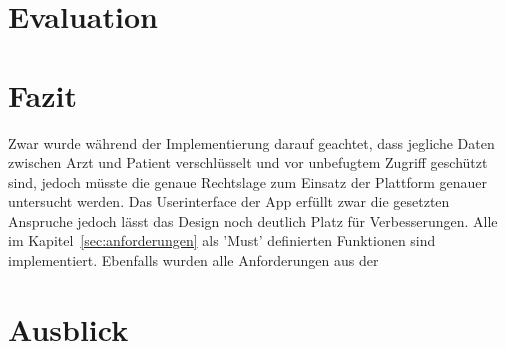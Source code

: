     \newpage
    \chapter{Evaluation}
    \chapter{Fazit}\label{ch:fazit}
    Zwar wurde während der Implementierung darauf geachtet, dass jegliche Daten zwischen Arzt und Patient verschlüsselt und vor unbefugtem Zugriff geschützt sind, jedoch müsste die genaue Rechtslage zum Einsatz der Plattform genauer untersucht werden.
    Das Userinterface der App erfüllt zwar die gesetzten Anspruche jedoch lässt das Design noch deutlich Platz für Verbesserungen.
    Alle im Kapitel~\ref{sec:anforderungen} als 'Must' definierten Funktionen sind implementiert.
    Ebenfalls wurden alle Anforderungen aus der
    \chapter{Ausblick}\label{ch:ausblick}

%

%

    \backmatter
    \listoffigures

    
    

    \appendix




%
%